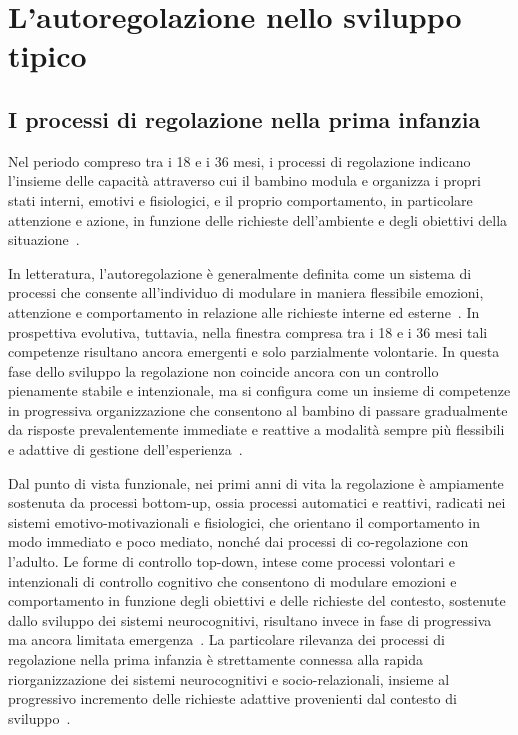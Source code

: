\chapter{L'autoregolazione nello sviluppo tipico}
\label{cap:uno}
\pagestyle{fancy}
\testatecapitoli   %
    \section{I processi di regolazione nella prima infanzia}
    \label{sec:1_1}

        Nel periodo compreso tra i 18 e i 36 mesi, i processi di regolazione indicano l'insieme delle capacità attraverso cui il bambino modula e organizza i propri stati interni, emotivi e fisiologici, e il proprio comportamento, in particolare attenzione e azione, in funzione delle richieste dell'ambiente e degli obiettivi della situazione~\cite{kopp1982,calkins2007}.

        In letteratura, l'autoregolazione è generalmente definita come un sistema di processi che consente all'individuo di modulare in maniera flessibile emozioni, attenzione e comportamento in relazione alle richieste interne ed esterne~\cite{cole2004}. In prospettiva evolutiva, tuttavia, nella finestra compresa tra i 18 e i 36 mesi tali competenze risultano ancora emergenti e solo parzialmente volontarie. In questa fase dello sviluppo la regolazione non coincide ancora con un controllo pienamente stabile e intenzionale, ma si configura come un insieme di competenze in progressiva organizzazione che consentono al bambino di passare gradualmente da risposte prevalentemente immediate e reattive a modalità sempre più flessibili e adattive di gestione dell'esperienza~\cite{blair2015}.

        Dal punto di vista funzionale, nei primi anni di vita la regolazione è ampiamente sostenuta da processi bottom-up, ossia processi automatici e reattivi, radicati nei sistemi emotivo-motivazionali e fisiologici, che orientano il comportamento in modo immediato e poco mediato, nonché dai processi di co-regolazione con l'adulto. Le forme di controllo top-down, intese come processi volontari e intenzionali di controllo cognitivo che consentono di modulare emozioni e comportamento in funzione degli obiettivi e delle richieste del contesto, sostenute dallo sviluppo dei sistemi neurocognitivi, risultano invece in fase di progressiva ma ancora limitata emergenza~\cite{blair2015}. La particolare rilevanza dei processi di regolazione nella prima infanzia è strettamente connessa alla rapida riorganizzazione dei sistemi neurocognitivi e socio-relazionali, insieme al progressivo incremento delle richieste adattive provenienti dal contesto di sviluppo~\cite{calkins2007}.

